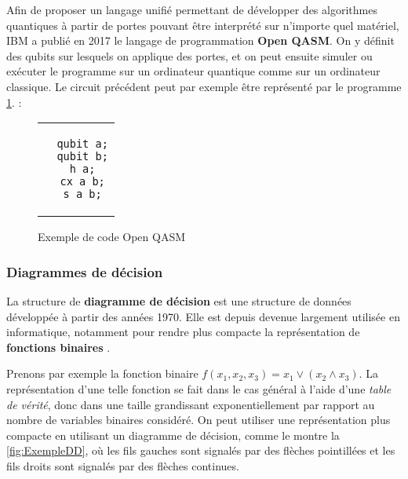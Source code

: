 \vspace{1em}

Afin de proposer un langage unifié permettant de développer des algorithmes quantiques à partir de portes pouvant être interprété sur n'importe quel matériel, IBM a publié en 2017 le langage de programmation \textbf{Open QASM}. \cite{QASM_2017} On y définit des qubits sur lesquels on applique des portes, et on peut ensuite simuler ou exécuter le programme sur un ordinateur quantique comme sur un ordinateur classique. Le circuit précédent peut par exemple être représenté par le programme \ref{lst:QASM}. :

\begin{figure}[thp]
  \renewcommand{\figurename}{Programme}
  \centering
\begin{tabular}{c}
\begin{lstlisting}
  qubit a;
  qubit b;
  h a;
  cx a b;
  s a b;
\end{lstlisting}
\end{tabular}
\caption{Exemple de code Open QASM}
\label{lst:QASM}
\end{figure}

\subsubsection*{Diagrammes de décision}

La structure de \textbf{diagramme de décision} est une structure de données développée à partir des années 1970. Elle est depuis devenue largement utilisée en informatique, notamment pour rendre plus compacte la représentation de \textbf{fonctions binaires} \cite{Minato_1996}.

Prenons par exemple la fonction binaire $f(x_1, x_2, x_3) = x_1 \lor (x_2 \land x_3)$. La représentation d'une telle fonction se fait dans le cas général à l'aide d'une \textit{table de vérité}, donc dans une taille grandissant exponentiellement par rapport au nombre de variables binaires considéré. On peut utiliser une représentation plus compacte en utilisant un diagramme de décision, comme le montre la \autoref{fig:ExempleDD}, où les fils gauches sont signalés par des flèches pointillées et les fils droits sont signalés par des flèches continues.

